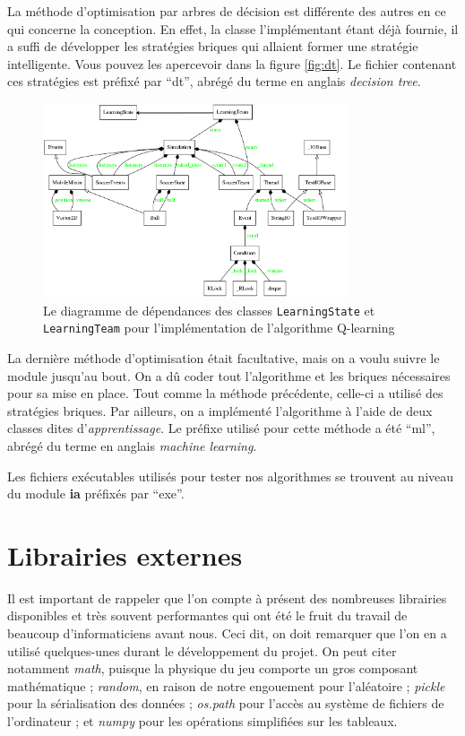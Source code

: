 \documentclass[12pt,a4paper]{article}
\begin{document}
La m\'ethode d'optimisation par arbres de d\'ecision est diff\'erente des 
autres en ce qui concerne la conception. En effet, la classe l'impl\'ementant 
\'etant d\'ej\`a fournie, il a suffi de d\'evelopper les strat\'egies briques 
qui allaient former une strat\'egie intelligente. Vous pouvez les apercevoir 
dans la figure \ref{fig:dt}. Le fichier contenant ces strat\'egies est 
pr\'efix\'e par \enquote{dt}, abr\'eg\'e du terme en anglais {\itshape 
decision tree}.

\begin{figure}[!h]
  \centering
  \captionsetup{justification=centering}
  \includegraphics[width=0.8\textwidth]{machineLearning_mod}
  \caption[Les classes pour l'apprentissage automatique]{Le diagramme de 
d\'ependances des classes \texttt{LearningState} et \texttt{LearningTeam} pour 
l'impl\'ementation de l'algorithme Q-learning}
  \label{fig:ml}
\end{figure}

La derni\`ere m\'ethode d'optimisation \'etait facultative, mais on a voulu 
suivre le module jusqu'au bout. On a d\^u coder tout l'algorithme et les 
briques n\'ecessaires pour sa mise en place. Tout comme la m\'ethode 
pr\'ec\'edente, celle-ci a utilis\'e des strat\'egies briques. Par ailleurs, on 
a impl\'ement\'e l'algorithme \`a l'aide de deux classes dites 
d'{\itshape apprentissage}.
Le pr\'efixe utilis\'e pour cette m\'ethode a \'et\'e \enquote{ml}, abr\'eg\'e 
du terme en anglais {\itshape machine learning}.

\medskip
Les fichiers ex\'ecutables utilis\'es pour tester nos algorithmes se trouvent 
au niveau du module {\bfseries ia} pr\'efix\'es par \enquote{exe}.

\section{Librairies externes}
Il est important de rappeler que l'on compte \`a pr\'esent des nombreuses 
librairies disponibles et tr\`es souvent performantes qui ont \'et\'e le fruit 
du travail de beaucoup d'informaticiens avant nous. Ceci dit, on doit remarquer 
que l'on en a utilis\'e quelques-unes durant le d\'eveloppement du projet. On 
peut citer notamment {\itshape math}, puisque la physique du jeu comporte un 
gros composant math\'ematique ; {\itshape random}, en raison de notre 
engouement pour l'al\'eatoire ; {\itshape pickle} pour la s\'erialisation des 
donn\'ees ; {\itshape os.path} pour l'acc\`es au syst\`eme de fichiers de 
l'ordinateur ; et {\itshape numpy} pour les op\'erations simplifi\'ees sur les 
tableaux.
\end{document}
